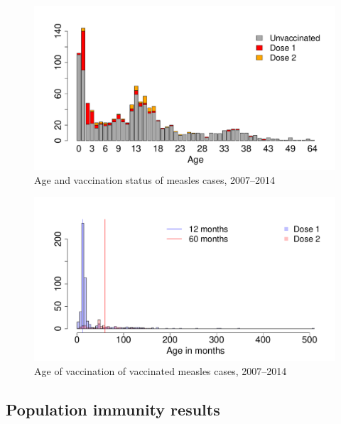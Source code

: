 \documentclass{article}
\begin{document}
\begin{figure}
\begin{center}
\includegraphics{draftfinalreport-020}
\end{center}
\caption{Age and vaccination status of measles cases, 2007--2014}
\label{fig:ageandvac}
\end{figure}

\begin{figure}
\begin{center}
\includegraphics{draftfinalreport-021}
\end{center}
\caption{Age of vaccination of vaccinated measles cases, 2007--2014}
\label{fig:vaccstat}
\end{figure}

\subsection{Population immunity results}
\end{document}
